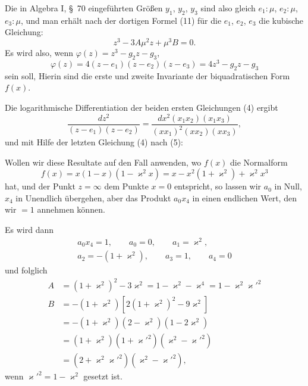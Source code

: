 
Die in Algebra I, \S\ 70 eingeführten Größen $y_1$, $y_2$, $y_3$ sind also gleich $e_1{:}\mu$, $e_2{:}\mu$, $e_3{:}\mu$, und man erhält nach der dortigen Formel (11) für die $e_1$, $e_2$, $e_3$ die kubische Gleichung:
\[
z^3 - 3A\mu^2 z + \mu^3 B = 0.
\]
Es wird also, wenn $\varphi(z) = z^3 - g_2 z - g_3$, %
\[
\varphi(z) = 4(z-e_1)(z-e_2)(z-e_3) = 4z^3 - g_2 z - g_3
\]
sein soll,
Hierin sind
die erste und zweite Invariante der biquadratischen Form $f(x)$.

Die logarithmische Differentiation der beiden ersten Gleichungen (4) ergibt
\[
\frac{dz^2}{(z-e_1)(z-e_2)} = \frac{dx^2(x_1x_2)(x_1x_3)}{(xx_1)^2(xx_2)(xx_3)},
\]
und mit Hilfe der letzten Gleichung (4) nach (5):

Wollen wir diese Resultate auf den Fall anwenden, wo $f(x)$ die Normalform
\[
f(x) = x(1-x)(1-\varkappa^2x) = x - x^2(1+\varkappa^2) + \varkappa^2x^3
\]
hat, und der Punkt $z=\infty$ dem Punkte $x=0$ entspricht, so lassen wir $a_0$ in Null, $x_4$ in Unendlich übergehen, aber das Produkt $a_0x_4$ in einen endlichen Wert, den wir $=1$ annehmen können.

Es wird dann
\[
\begin{gathered}
a_0x_4 = 1, \qquad a_0 = 0, \qquad a_1 = \varkappa^2,\\
a_2 = -(1+\varkappa^2), \qquad a_3 = 1, \qquad a_4 = 0
\end{gathered}
\]
und folglich
\[
\begin{aligned}
A &= (1+\varkappa^2)^2 - 3\varkappa^2 = 1 - \varkappa^2 - \varkappa^4 = 1 - \varkappa^2\varkappa'^2 %
\\
B &= -(1+\varkappa^2)[2(1+\varkappa^2)^2 - 9\varkappa^2]\\
&= -(1+\varkappa^2)(2-\varkappa^2)(1-2\varkappa^2)\\
&= (1+\varkappa^2)(1+\varkappa'^2)(\varkappa^2-\varkappa'^2)\\
&= (2+\varkappa^2\varkappa'^2)(\varkappa^2-\varkappa'^2),
\end{aligned}
\]
wenn $\varkappa'^2 = 1 - \varkappa^2$ gesetzt ist.
